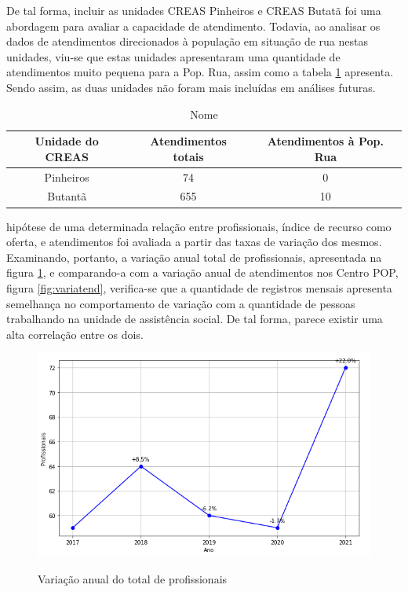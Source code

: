 De tal forma, incluir as unidades CREAS Pinheiros e CREAS Butatã foi uma abordagem para avaliar a capacidade de atendimento. Todavia, ao analisar os dados de atendimentos direcionados à população em situação de rua nestas unidades, viu-se que estas unidades apresentaram uma quantidade de atendimentos muito pequena para a Pop. Rua, assim como a tabela     \ref{tabelacreas} apresenta. Sendo assim, as duas unidades não foram mais incluídas em análises futuras. 

\begin{table}[h]
    \label{tabelacreas}
    \centering
    \begin{center}
        \caption{Nome}
            \begin{tabular}{||c c c||} 
            \hline
            Unidade do CREAS & Atendimentos totais & Atendimentos à Pop. Rua \\
            [0.5ex] 
            \hline\hline
            Pinheiros & 74 & 0  \\ 
            \hline
            Butantã & 655 & 10 \\ 
            
            \hline
        \end{tabular}
        \end{center}
\end{table}


 hipótese de uma determinada relação entre profissionais, índice de recurso como oferta, e atendimentos foi avaliada a partir das taxas de variação dos mesmos. Examinando, portanto, a variação anual total de profissionais, apresentada na figura \ref{fig:variprof}, e comparando-a com a variação anual de atendimentos nos Centro POP, figura \ref{fig:variatend}, verifica-se que a quantidade de registros mensais apresenta semelhança no comportamento de variação com a quantidade de pessoas trabalhando na unidade de assistência social. De tal forma, parece existir uma alta correlação entre os dois. 

\begin{figure}
    \centering
    \caption{Variação anual do total de profissionais}
    \includegraphics[width = .9\linewidth]{relatorios/grupo2/figuras/variacaoanualprof.png}
    \label{fig:variprof}
\end{figure}

